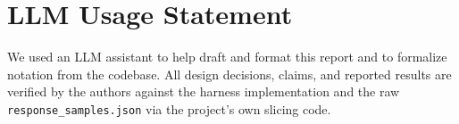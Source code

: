\documentclass[11pt]{article}
\begin{document}
\bigskip











\section*{LLM Usage Statement}
We used an LLM assistant to help draft and format this report and to formalize
notation from the codebase. All design decisions, claims, and reported results
are verified by the authors against the harness implementation and the raw
\texttt{response\_samples.json} via the project's own slicing code.
\end{document}
